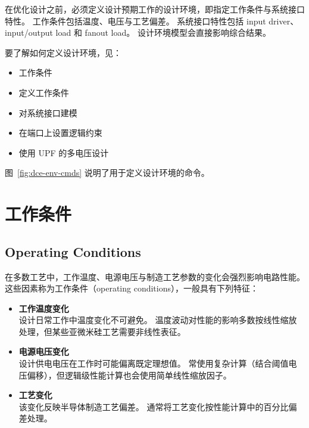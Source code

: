 \label{chap:env}

在优化设计之前，必须定义设计预期工作的设计环境，即指定工作条件与系统接口特性。
工作条件包括温度、电压与工艺偏差。
系统接口特性包括 input driver、input/output load 和 fanout load。
设计环境模型会直接影响综合结果。

要了解如何定义设计环境，见：
\begin{itemize}
  \item 工作条件
  \item 定义工作条件
  \item 对系统接口建模
  \item 在端口上设置逻辑约束
  \item 使用 UPF 的多电压设计
\end{itemize}

图~\ref{fig:dce-env-cmds} 说明了用于定义设计环境的命令。


\section{工作条件}
\subsection*{Operating Conditions}

在多数工艺中，工作温度、电源电压与制造工艺参数的变化会强烈影响电路性能。
这些因素称为工作条件（operating conditions），一般具有下列特征：
\begin{itemize}
  \item \textbf{工作温度变化}\\
        设计日常工作中温度变化不可避免。
        温度波动对性能的影响多数按线性缩放处理，但某些亚微米硅工艺需要非线性表征。
  \item \textbf{电源电压变化}\\
        设计供电电压在工作时可能偏离既定理想值。
        常使用复杂计算（结合阈值电压偏移），但逻辑级性能计算也会使用简单线性缩放因子。
  \item \textbf{工艺变化}\\
        该变化反映半导体制造工艺偏差。
        通常将工艺变化按性能计算中的百分比偏差处理。
\end{itemize}

